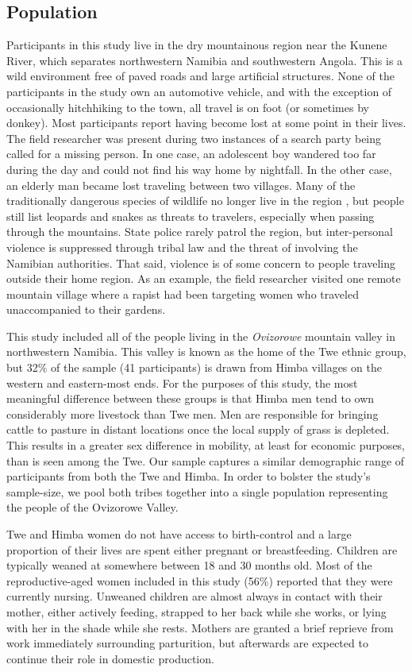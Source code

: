 	\subsection{Population}
Participants in this study live in the dry mountainous region near the Kunene River, which separates northwestern Namibia and southwestern Angola.  This is a wild environment free of paved roads and large artificial structures.  None of the participants in the study own an automotive vehicle, and with the exception of occasionally hitchhiking to the town, all travel is on foot (or sometimes by donkey).  Most participants report having become lost at some point in their lives.  The field researcher was present during two instances of a search party being called for a missing person.  In one case, an adolescent boy wandered too far during the day and could not find his way home by nightfall.  In the other case, an elderly man became lost traveling between two villages.  Many of the traditionally dangerous species of wildlife no longer live in the region \citep{viljoen1982distribution}, but people still list leopards and snakes as threats to travelers, especially when passing through the mountains.  State police rarely patrol the region, but inter-personal violence is suppressed through tribal law and the threat of involving the Namibian authorities.  That said, violence is of some concern to people traveling outside their home region.  As an example, the field researcher visited one remote mountain village where a rapist had been targeting women who traveled unaccompanied to their gardens.

This study included all of the people living in the \emph{Ovizorowe} mountain valley in northwestern Namibia.  This valley is known as the home of the Twe ethnic group, but 32\% of the sample (41 participants) is drawn from Himba villages on the western and eastern-most ends.  For the purposes of this study, the most meaningful difference between these groups is that Himba men tend to own considerably more livestock than Twe men.  Men are responsible for bringing cattle to pasture in distant locations once the local supply of grass is depleted.  This results in a greater sex difference in mobility, at least for economic purposes, than is seen among the Twe.  Our sample captures a similar demographic range of participants from both the Twe and Himba.  In order to bolster the study's sample-size, we pool both tribes together into a single population representing the people of the Ovizorowe Valley.

Twe and Himba women do not have access to birth-control and a large proportion of their lives are spent either pregnant or breastfeeding.  Children are typically weaned at somewhere between 18 and 30 months old.  Most of the reproductive-aged women included in this study (56\%) reported that they were currently nursing.  Unweaned children are almost always in contact with their mother, either actively feeding, strapped to her back while she works, or lying with her in the shade while she rests.  Mothers are granted a brief reprieve from work immediately surrounding parturition, but afterwards are expected to continue their role in domestic production.

